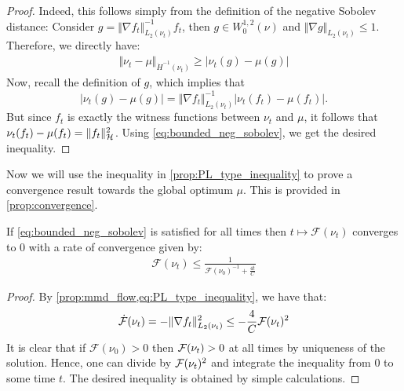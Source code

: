 \begin{proof}
	Indeed, this follows simply from the definition of the negative Sobolev distance: Consider $g = \Vert \nabla f_t\Vert^{-1}_{L_2(\nu_t)} f_t$, then $g\in W_0^{1,2}(\nu)$  and $\Vert \nabla g \Vert_{L_2(\nu_t)}\leq 1$. Therefore, we directly have:
	\begin{align}
		\Vert \nu_t - \mu\Vert_{\dot{H}^{-1}(\nu_t)}\geq \vert \nu_t(g) - \mu(g)  \vert
	\end{align}
Now, recall the definition of $g$, which implies that
\[
\vert \nu_t(g) - \mu(g)  \vert = \Vert \nabla f_t\Vert^{-1}_{L_2(\nu_t)} \vert \nu_t(f_t)-\mu(f_t)\vert.
\]
But since $f_t$  is exactly the witness functions between $\nu_t$ and $\mu$, it follows that $\nu_t(f_t)-\mu(f_t) = \Vert f_t\Vert^2_{{{\mathcal H}}}$.
Using \cref{eq:bounded_neg_sobolev}, we get the desired inequality.
\end{proof}

Now we will use the inequality in \cref{prop:PL_type_inequality} to prove a convergence result towards the global optimum $\mu$. This is provided in \cref{prop:convergence}.

\begin{proposition}\label{prop:convergence}
	If \cref{eq:bounded_neg_sobolev} is satisfied for all times then $t\mapsto \mathcal{F}(\nu_t)$ converges to $0$ with a rate of convergence given by:
	\begin{align}
		\mathcal{F}(\nu_t)\leq \frac{1}{\mathcal{F}(\nu_0)^{-1} + \frac{4t}{C}}
	\end{align}
\end{proposition}
\begin{proof}
	By \cref{prop:mmd_flow,eq:PL_type_inequality}, we have that: %
	\begin{align}
		\dot{{{\mathcal F}}}(\nu_t) = - \Vert \nabla f_t \Vert^2_{L_2(\nu_t)} \leq  -\frac{4}{C}{{\mathcal F}}(\nu_t)^2	
	\end{align}
It is clear that if $\mathcal{F}(\nu_0)>0$ then ${{\mathcal F}}(\nu_t)>0$ at all times by uniqueness of the solution. Hence, one can divide by ${{\mathcal F}}(\nu_t)^2$ and integrate the inequality from $0$ to some time $t$. The desired inequality is obtained by simple calculations.
\end{proof}

